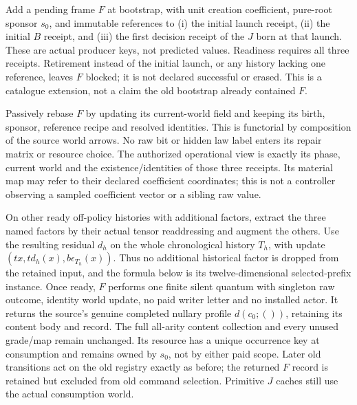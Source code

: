 \documentclass{article}
\begin{document}
Add a pending frame $F$ at bootstrap, with unit creation coefficient, pure-root sponsor $s_0$, and immutable references to (i) the initial launch receipt, (ii) the initial $B$ receipt, and (iii) the first decision receipt of the $J$ born at that launch. These are actual producer keys, not predicted values. Readiness requires all three receipts. Retirement instead of the initial launch, or any history lacking one reference, leaves $F$ blocked; it is not declared successful or erased. This is a catalogue extension, not a claim the old bootstrap already contained $F$.

Passively rebase $F$ by updating its current-world field and keeping its birth, sponsor, reference recipe and resolved identities. This is functorial by composition of the source world arrows. No raw bit or hidden law label enters its repair matrix or resource choice. The authorized operational view is exactly its phase, current world and the existence/identities of those three receipts. Its material map may refer to their declared coefficient coordinates; this is not a controller observing a sampled coefficient vector or a sibling raw value.

On other ready off-policy histories with additional factors, extract the three named factors by their actual tensor readdressing and augment the others. Use the resulting residual $d_h$ on the whole chronological history $T_h$, with update $(tx,t d_h(x),b\epsilon_{T_h}(x))$. Thus no additional historical factor is dropped from the retained input, and the formula below is its twelve-dimensional selected-prefix instance. Once ready, $F$ performs one finite silent quantum with singleton raw outcome, identity world update, no paid writer letter and no installed actor. It returns the source's genuine completed nullary profile $d(c_0;())$, retaining its content body and record. The full all-arity content collection and every unused grade/map remain unchanged. Its resource has a unique occurrence key at consumption and remains owned by $s_0$, not by either paid scope. Later old transitions act on the old registry exactly as before; the returned $F$ record is retained but excluded from old command selection. Primitive $J$ caches still use the actual consumption world.
\end{document}
